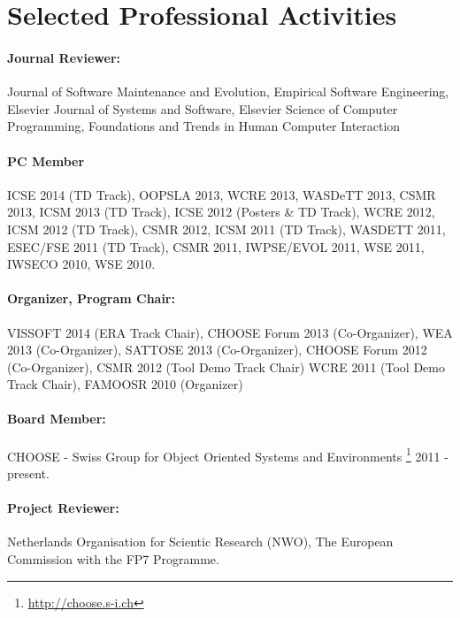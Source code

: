 
\section{Selected Professional Activities}

\paragraph{Journal Reviewer:}
Journal of Software Maintenance and Evolution, %
Empirical Software Engineering, %
Elsevier Journal of Systems and Software,
Elsevier Science of Computer Programming, %
Foundations and Trends in Human Computer Interaction %


\paragraph{PC Member} 
ICSE 2014 (TD Track),
OOPSLA 2013,
WCRE 2013, 
WASDeTT 2013,
CSMR 2013, 
ICSM 2013 (TD Track), 
ICSE 2012 (Posters \& TD Track), 
WCRE 2012, 
ICSM 2012 (TD Track), 
CSMR 2012,
ICSM 2011 (TD Track), 
WASDETT 2011, 
ESEC/FSE 2011 (TD Track), 
CSMR 2011, 
IWPSE/EVOL 2011, 
WSE 2011, 
IWSECO 2010, 
WSE 2010.

\paragraph{Organizer, Program Chair:}
VISSOFT 2014 (ERA Track Chair),
CHOOSE Forum 2013 (Co-Organizer),
WEA 2013 (Co-Organizer),
SATTOSE 2013 (Co-Organizer),
CHOOSE Forum 2012 (Co-Organizer),
CSMR 2012 (Tool Demo Track Chair)
WCRE 2011 (Tool Demo Track Chair), 
FAMOOSR 2010 (Organizer)

\paragraph{Board Member:}
CHOOSE - Swiss Group for Object Oriented Systems and Environments \footnote{\url{http://choose.s-i.ch}} 2011 - present.

\paragraph {Project Reviewer:}
Netherlands Organisation for Scientic Research (NWO), 
The European Commission with the FP7 Programme.
